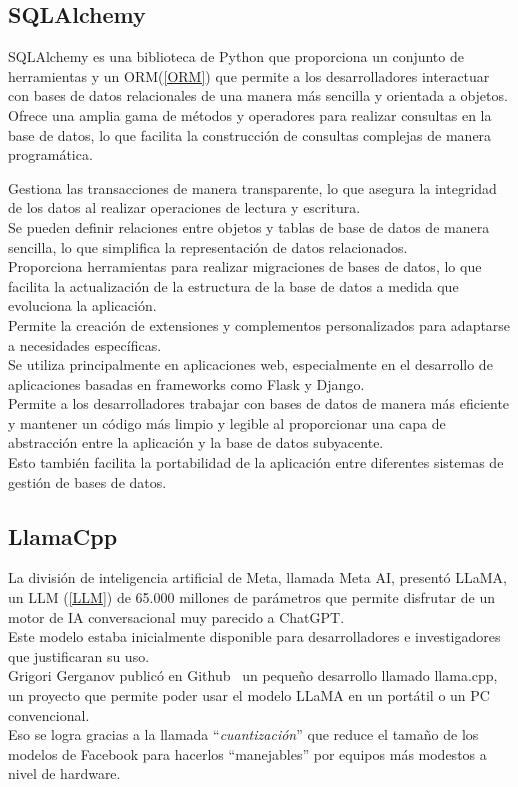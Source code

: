 \subsection{SQLAlchemy~\cite{bayer2012sqlalchemy}}
SQLAlchemy es una biblioteca de Python que proporciona un conjunto de herramientas y
 un ORM(\ref{ORM}) que permite a los desarrolladores interactuar 
con bases de datos relacionales de una manera más sencilla y orientada a objetos.\\

Ofrece una amplia gama de métodos y operadores para realizar consultas en la base de datos, 
lo que facilita la construcción de consultas complejas de manera programática.

Gestiona las transacciones de manera transparente, lo que asegura la integridad 
de los datos al realizar operaciones de lectura y escritura.\\
Se pueden definir relaciones entre objetos y tablas de base de datos de manera sencilla,
 lo que simplifica la representación de datos relacionados.\\
Proporciona herramientas para realizar migraciones de bases de datos, 
lo que facilita la actualización de la estructura de la base de datos a medida 
que evoluciona la aplicación.\\
Permite la creación de extensiones y complementos personalizados 
para adaptarse a necesidades específicas.\\
Se utiliza principalmente en aplicaciones web, 
especialmente en el desarrollo de aplicaciones basadas en frameworks como Flask y Django. \\
Permite a los desarrolladores trabajar con bases de datos de manera más eficiente y 
mantener un código más limpio y legible al proporcionar una capa de abstracción entre la 
aplicación y la base de datos subyacente.\\ 
Esto también facilita la portabilidad de la aplicación entre diferentes sistemas de 
gestión de bases de datos.\\


\subsection{LlamaCpp~\cite{metallamaLM}}
La división de inteligencia artificial de Meta, llamada Meta AI, presentó LLaMA, un LLM (\ref{LLM}) de 
65.000 millones de parámetros que permite disfrutar de un motor de 
IA conversacional muy parecido a ChatGPT.\\
Este modelo estaba inicialmente disponible para desarrolladores e investigadores 
que justificaran su uso.\\
Grigori Gerganov publicó en Github~\cite{gerganovllamaCpp} un pequeño desarrollo llamado llama.cpp,
un proyecto que permite poder usar el modelo LLaMA en un portátil o un PC convencional.\\ 
Eso se logra gracias a la llamada ``\emph{cuantización}'' que reduce el tamaño de los modelos de 
Facebook para hacerlos ``manejables'' por equipos más modestos a nivel de hardware.


